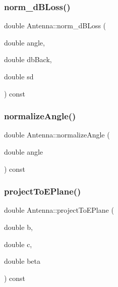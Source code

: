 \subsubsection{\texorpdfstring{norm\_dBLoss()}{norm\_dBLoss()}}
{\footnotesize\ttfamily double Antenna\+::norm\+\_\+d\+B\+Loss (\begin{DoxyParamCaption}\item[{double}]{angle,  }\item[{double}]{db\+Back,  }\item[{double}]{sd }\end{DoxyParamCaption}) const\hspace{0.3cm}{\ttfamily [private]}}

\mbox{\label{class_antenna_a353ae3aafbc75033c30fb96004c2b73f}} 
\subsubsection{\texorpdfstring{normalizeAngle()}{normalizeAngle()}}
{\footnotesize\ttfamily double Antenna\+::normalize\+Angle (\begin{DoxyParamCaption}\item[{double}]{angle }\end{DoxyParamCaption}) const\hspace{0.3cm}{\ttfamily [private]}}

\mbox{\label{class_antenna_a298c80a54828c8f13d584e8e382145a5}} 
\subsubsection{\texorpdfstring{projectToEPlane()}{projectToEPlane()}}
{\footnotesize\ttfamily double Antenna\+::project\+To\+E\+Plane (\begin{DoxyParamCaption}\item[{double}]{b,  }\item[{double}]{c,  }\item[{double}]{beta }\end{DoxyParamCaption}) const\hspace{0.3cm}{\ttfamily [private]}}

\mbox{\label{class_antenna_aa21a4c0d581c59c36480d932584c0ef5}} 
